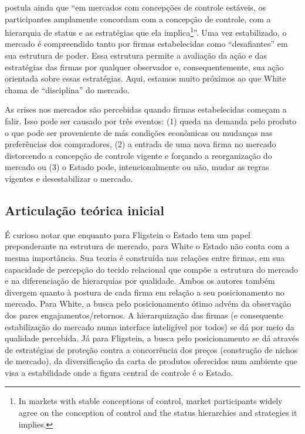 \documentclass[a4paper, 12pt, openright, oneside, german, french, english, brazil]{abntex2}
\begin{document}
	 postula ainda que ``em mercados com concepções de controle estáveis, os participantes amplamente concordam com a concepção de controle, com a hierarquia de status e as estratégias que ela implica\footnote{In markets with stable conceptions of control, market participants widely agree on the conception of control and the status hierarchies and strategies it implies.}''. Uma vez estabilizado, o mercado é compreendido tanto por firmas estabelecidas como ``desafiantes'' em sua estrutura de poder. Essa estrutura permite a avaliação da ação e das estratégias das firmas por qualquer observador e, consequentemente, sua ação orientada sobre essas estratégias. Aqui, estamos muito próximos ao que White chama de ``disciplina'' do mercado.

	As crises nos mercados são percebidas quando firmas estabelecidas começam a falir. Isso pode ser causado por três eventos: (1) queda na demanda pelo produto o que pode ser proveniente de más condições econômicas ou mudanças nas preferências dos compradores, (2) a entrada de uma nova firma no mercado distorcendo a concepção de controle vigente e forçando a reorganização do mercado ou (3) o Estado pode, intencionalmente ou não, mudar as regras vigentes e desestabilizar o mercado.

	\subsection{Articulação teórica inicial}

	É curioso notar que enquanto para Fligstein o Estado tem um papel preponderante na estrutura de mercado, para White o Estado não conta com a mesma importância. Sua teoria é construída nas relações entre firmas, em sua capacidade de percepção do tecido relacional que compõe a estrutura do mercado e na diferenciação de hierarquias por qualidade. Ambos os autores também divergem quanto à postura de cada firma em relação a seu posicionamento no mercado. Para White, a busca pelo posicionamento ótimo advém da observação dos pares engajamentos/retornos. A hierarquização das firmas (e consequente estabilização do mercado numa interface inteligível por todos) se dá por meio da qualidade percebida. Já para Fligstein, a busca pelo posicionamento se dá através de estratégias de proteção contra a concorrência dos preços (construção de nichos de mercado), da diversificação da carta de produtos oferecidos num ambiente que visa a estabilidade onde a figura central de controle é o Estado.
\end{document}
